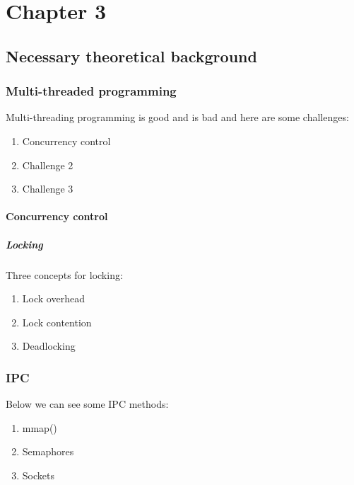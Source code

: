 \chapter{Chapter 3}\label{ch:archipelago}

\section{Necessary theoretical background}

\subsection{Multi-threaded programming}


Multi-threading programming is good and is bad and here are some challenges:

\begin{enumerate}
	\item Concurrency control
	\item Challenge 2
	\item Challenge 3
\end{enumerate}

\subsubsection{Concurrency control}

\paragraph{Locking}


Three concepts for locking:

\begin{enumerate}
	\item Lock overhead
	\item Lock contention
	\item Deadlocking
\end{enumerate}

\subsection{IPC}

Below we can see some IPC methods:

\begin{enumerate}
	\item mmap()
	\item Semaphores
	\item Sockets
\end{enumerate}


